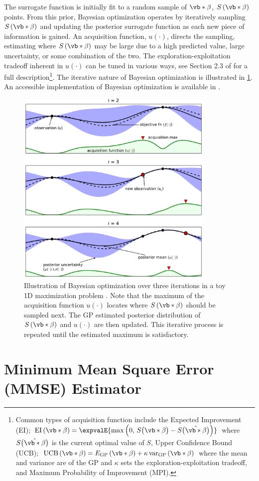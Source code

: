 The surrogate function is initially fit to
a random sample of $\vb*{\beta}$, $S\left(\vb*{\beta}\right)$ points.
From this prior, Bayesian optimization
operates by iteratively sampling $S\left(\vb*{\beta}\right)$ and updating
the posterior surrogate function as each new piece of information is gained.
An acquisition function, $u\left(\cdot\right)$, directs the sampling,
estimating where $S\left(\vb*{\beta}\right)$ may be large
due to a high predicted value, large uncertainty, or some combination of the two.
The exploration-exploitation tradeoff inherent in $u\left(\cdot\right)$
can be tuned in various ways, see Section 2.3 of \cite{Brochu2010} for a full description\footnote{Common types of acquisition function include the
Expected Improvement (EI);
$\text{EI}\left(\vb*{\beta}\right) = \expvalE{\max\left(0,\,S\big(\vb*{\beta}\big) - S\big(\hat{\vb*{\beta}}\big)\right)}$
where $S\big(\hat{\vb*{\beta}}\big)$ is the current optimal value of $S$,
Upper Confidence Bound (UCB);
$\text{UCB}\left(\vb*{\beta}\right) = E_{\text{GP}} \left(\vb*{\beta}\right) + \kappa\,\text{var}_{\text{GP}} \left(\vb*{\beta}\right)$ where the mean and variance are of the GP and $\kappa$ sets the exploration-exploitation tradeoff,
and Maximum Probability of Improvement (MPI).}.
The iterative nature of Bayesian optimization is illustrated in \cref{fig:BO_ex}.
An accessible implementation of Bayesian optimization is available in \skopt \cite{scikit-optimize,Borisyak}.

\begin{figure}[H] %
\centering
\includegraphics[width=0.85\textwidth]{figures/ml/toyGPtext3}
\caption{
Illustration of Bayesian optimization over three iterations in a toy 1D maximization problem \cite{Brochu2010}.
Note that the maximum of the acquisition function $u\left(\cdot\right)$
locates where $S\left(\vb*{\beta}\right)$ should be sampled next.
The GP estimated posterior distribution of $S\left(\vb*{\beta}\right)$
and $u\left(\cdot\right)$ are then updated.
This iterative process is repeated until the estimated maximum is satisfactory.
}
\label{fig:BO_ex}
\end{figure}

\section{Minimum Mean Square Error (MMSE) Estimator}
\label{opt:BO:MMSE}
